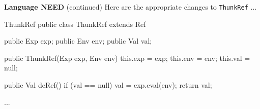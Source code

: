 
\begin{minipage}[t]{\sw}
\slidenumber
\LARGE
{\bf Language NEED} (continued)\exx
\Large
Here are the appropriate changes
to \verb'ThunkRef' ...
\large
\begin{qv}
ThunkRef
public class ThunkRef extends Ref {

    public Exp exp;
    public Env env;
    public Val val;

    public ThunkRef(Exp exp, Env env) {
        this.exp = exp;
        this.env = env;
        this.val = null;
    }

    public Val deRef() {
        if (val == null)
            val = exp.eval(env);
        return val;
    }

...

}
\end{qv}
\end{minipage}
\clearpage
